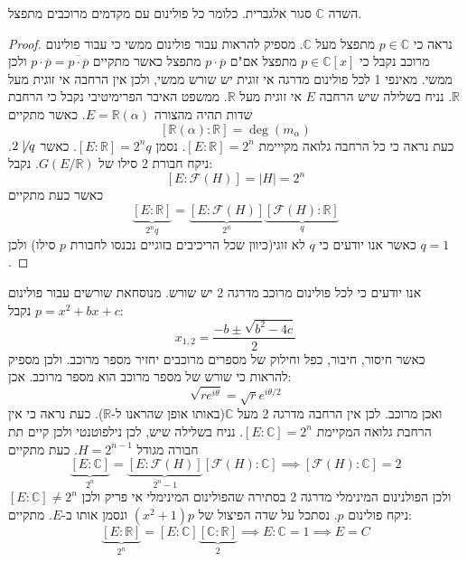 \documentclass{tstextbook}
\begin{document}
\begin{proposition}
השדה \(\mathbb{C}\) סגור אלגברית. כלומר כל פולינום עם מקדמים מרוכבים מתפצל.

\end{proposition}
\begin{proof}
נראה כי \(p \in \mathbb{C}\) מתפצל מעל \(\mathbb{C}\). מספיק להראות עבור פולינום ממשי כי עבור פולינום מרוכב נקבל כי \(p \in \mathbb{C}[x]\) מתפצל אם"ם \(p\cdot \overline{p}\) מתפצל כאשר מתקיים \(p\cdot \overline{p}=\overline{p\cdot \overline{p}}\) ולכן ממשי.
מאינפי 1 לכל פולינום מדרגה אי זוגית יש שורש ממשי, ולכן אין הרחבה אי זוגית מעל \(\mathbb{R}\). נניח בשלילה שיש הרחבה \(E\) אי זוגית מעל \(\mathbb{R}\). ממשפט האיבר הפרימיטיבי נקבל כי הרחבת שדות תהיה מהצורה \(E=\mathbb{R}\left( \alpha \right)\). כאשר מתקיים
$$\left[ \mathbb{R}\left( \alpha \right) :\mathbb{R}\right]=\deg\left( m_{\alpha} \right) $$
כעת נראה כי כל הרחבה גלואה מקייימת \(\left[ E:\mathbb{R} \right]=2^{n}\). נסמן \(\left[ E:\mathbb{R} \right]=2^{n}q\). כאשר \(2\not\mid q\). ניקח חבורת 2 סילו של \(G\left( E / \mathbb{R} \right)\). נקבל:
$$\left[ E:\mathcal{F} (H) \right]=\lvert H \rvert =2^{n}$$
כאשר כעת מתקיים
$$\underbrace{ \left[ E:\mathbb{R} \right] }_{ 2^{n}q }=\underbrace{ \left[ E:\mathcal{F} (H) \right] }_{ 2^{n} }\underbrace{ \left[ \mathcal{F} (H):\mathbb{R} \right] }_{ q }$$
כאשר אנו יודעים כי \(q\) לא זוגי(כיוון שכל הריכיבים בזוגיים נכנסו לחבורת \(p\) סילו) ולכן \(q=1\).

\end{proof}
אנו יודעים כי לכל פולינום מרוכב מדרגה 2 יש שורש. מנוסחאת שורשים עבור פולינום \(p=x^{2}+bx+c\) נקבל:
$$x_{1,2}=\frac{-b\pm \sqrt{ b^{2}-4c }}{2}$$
כאשר חיסור, חיבור, כפל וחילוק של מספרים מרוכבים יחזיר מספר מרוכב. ולכן מספיק להראות כי שורש של מספר מרוכב הוא מספר מרוכב. אכן:
$$\sqrt{ re^{ i\theta } }=\sqrt{ r }e^{ i\theta/2 }$$
ואכן מרוכב. לכן אין הרחבה מדרגה 2 מעל \(\mathbb{C}\)(באותו אופן שהראנו ל-\(\mathbb{R}\)). כעת נראה כי אין הרחבת גלואה המקיימת \(\left[ E:\mathbb{C} \right]=2^{n}\). נניח בשלילה שיש, לכן נילפוטנטי ולכן קיים תת חבורה מגודל \(H=2^{n-1}\). כעת מתקיים
$$\underbrace{ \left[ E:\mathbb{C} \right] }_{ 2^{n} }=\underbrace{ \left[ E:\mathcal{F} (H) \right] }_{ 2^{n} −1}\left[ \mathcal{F} (H):\mathbb{C} \right]\implies \left[ \mathcal{F} (H):\mathbb{C} \right] =2$$
ולכן הפולנינום  המינימלי מדרגה 2 בסתירה שהפולינום המינימלי אי פריק ולכן \(\left[ E:\mathbb{C} \right]\neq 2^{n}\)
ניקח פולינום \(p\). נסתכל על שדה הפיצול של \((x^{2}+1)p\) ונסמן אותו ב-\(E\). מתקיים:
$$\underbrace{ \left[ E:\mathbb{R} \right] }_{ 2^{n} }=\left[ E:\mathbb{C} \right]\underbrace{ \left[ \mathbb{C}:\mathbb{R} \right] }_{ 2 }\implies E:\mathbb{C}=1\implies E=C$$
\end{document}
